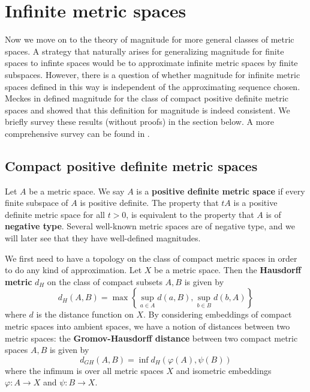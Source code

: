 \documentclass[11pt]{article}
\theoremstyle{mythm}
\begin{document}
\section{Infinite metric spaces}

Now we move on to the theory of magnitude for more general classes of metric spaces. A strategy that naturally arises for generalizing magnitude for finite spaces to infinte spaces would be to approximate infinite metric spaces by finite subspaces. However, there is a question of whether magnitude for infinite metric spaces defined in this way is independent of the approximating sequence chosen. Meckes in \cite{meckes_positive_2013} defined magnitude for the class of compact positive definite metric spaces and showed that this definition for magnitude is indeed consistent. We briefly survey these results (without proofs) in the section below. A more comprehensive survey can be found in \cite{leinster_magnitude_2017}.

\subsection{Compact positive definite metric spaces}

Let $A$ be a metric space. We say $A$ is a \textbf{positive definite metric space} if every finite subspace of $A$ is positive definite. The property that $tA$ is a positive definite metric space for all $t > 0$, is equivalent to the property that $A$ is of \textbf{negative type}. Several well-known metric spaces are of negative type, and we will later see that they have well-defined magnitudes.

We first need to have a topology on the class of compact metric spaces in order to do any kind of approximation. Let $X$ be a metric space. Then the \textbf{Hausdorff metric} $d_H$ on the class of compact subsets $A,B$ is given by
\begin{equation*}
d_H(A,B) = \max\left\{\sup\limits_{a\in A}d(a,B),\sup\limits_{b\in B}d(b,A)\right\}
\end{equation*}
where $d$ is the distance function on $X$. By considering embeddings of compact metric spaces into ambient spaces, we have a notion of distances between two metric spaces: the \textbf{Gromov-Hausdorff distance} between two compact metric spaces $A,B$ is given by
\begin{equation*}
d_{GH}(A,B) = \inf d_H(\varphi(A),\psi(B))
\end{equation*}
where the infimum is over all metric spaces $X$ and isometric embeddings $\varphi:A \to X$ and $\psi: B \to X$.
\end{document}
